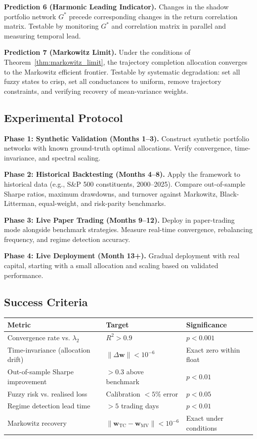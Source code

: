 \documentclass[twocolumn,10pt]{article}
\theoremstyle{remark}
\newcommand{\thmref}[1]{Theorem~\ref{#1}}
\begin{document}
\textbf{Prediction 6 (Harmonic Leading Indicator).}  Changes in the shadow portfolio network $G^*$ precede corresponding changes in the return correlation matrix.  Testable by monitoring $G^*$ and correlation matrix in parallel and measuring temporal lead.

\textbf{Prediction 7 (Markowitz Limit).}  Under the conditions of \thmref{thm:markowitz_limit}, the trajectory completion allocation converges to the Markowitz efficient frontier.  Testable by systematic degradation: set all fuzzy states to crisp, set all conductances to uniform, remove trajectory constraints, and verifying recovery of mean-variance weights.

\subsection{Experimental Protocol}

\textbf{Phase 1: Synthetic Validation (Months 1--3).}  Construct synthetic portfolio networks with known ground-truth optimal allocations.  Verify convergence, time-invariance, and spectral scaling.

\textbf{Phase 2: Historical Backtesting (Months 4--8).}  Apply the framework to historical data (e.g., S\&P 500 constituents, 2000--2025).  Compare out-of-sample Sharpe ratios, maximum drawdowns, and turnover against Markowitz, Black-Litterman, equal-weight, and risk-parity benchmarks.

\textbf{Phase 3: Live Paper Trading (Months 9--12).}  Deploy in paper-trading mode alongside benchmark strategies.  Measure real-time convergence, rebalancing frequency, and regime detection accuracy.

\textbf{Phase 4: Live Deployment (Month 13+).}  Gradual deployment with real capital, starting with a small allocation and scaling based on validated performance.

\subsection{Success Criteria}

\begin{center}
\begin{tabular}{lll}
\toprule
\textbf{Metric} & \textbf{Target} & \textbf{Significance} \\
\midrule
Convergence rate vs. $\lambda_2$ & $R^2 > 0.9$ & $p < 0.001$ \\
Time-invariance (allocation drift) & $\|\Delta \mathbf{w}\| < 10^{-6}$ & Exact zero within float \\
Out-of-sample Sharpe improvement & $> 0.3$ above benchmark & $p < 0.01$ \\
Fuzzy risk vs. realised loss & Calibration $< 5\%$ error & $p < 0.05$ \\
Regime detection lead time & $> 5$ trading days & $p < 0.01$ \\
Markowitz recovery & $\|\mathbf{w}_{\text{TC}} - \mathbf{w}_{\text{MV}}\| < 10^{-6}$ & Exact under conditions \\
\bottomrule
\end{tabular}
\end{center}
\end{document}

